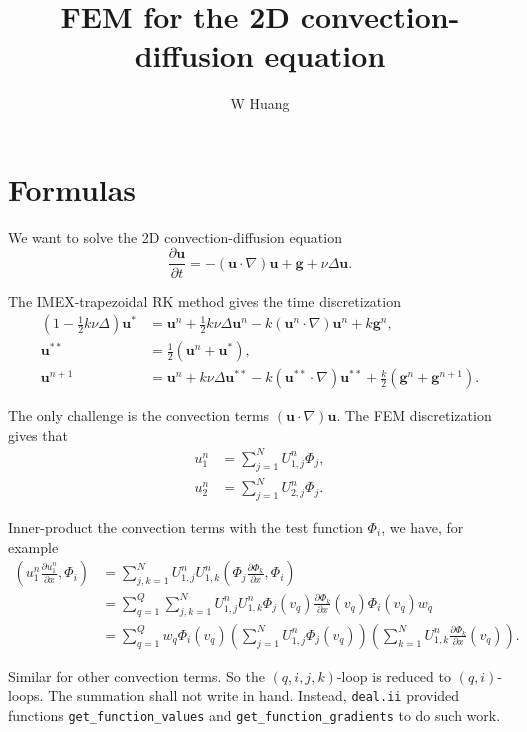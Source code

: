 \documentclass[lang=en,11pt,a4paper]{elegantpaper}
\title{FEM for the 2D convection-diffusion equation}
\author{W Huang}
\begin{document}
\maketitle

\section{Formulas}

We want to solve the 2D convection-diffusion equation
\begin{equation}
    \frac{\partial \mathbf{u}}{\partial t}=-(\mathbf{u}\cdot \nabla)\mathbf{u}+\mathbf{g}+\nu \Delta \mathbf{u}.
\end{equation}

The IMEX-trapezoidal RK method gives the time discretization
\begin{align}
    \left(1-\frac{1}{2}k\nu\Delta\right)\mathbf{u}^*&=\mathbf{u}^{n}+\frac{1}{2}k\nu\Delta\mathbf{u}^{n}-k(\mathbf{u}^n\cdot \nabla)\mathbf{u}^n+k\mathbf{g}^n,\\
    \mathbf{u}^{**}&=\frac{1}{2}(\mathbf{u}^n+\mathbf{u}^*),\\
    \mathbf{u}^{n+1}&=\mathbf{u}^n+k\nu\Delta\mathbf{u}^{**}-k(\mathbf{u}^{**}\cdot \nabla)\mathbf{u}^{**}+\frac{k}{2}(\mathbf{g}^n+\mathbf{g}^{n+1}).
\end{align}

The only challenge is the convection terms $(\mathbf{u}\cdot \nabla)\mathbf{u}$. 
The FEM discretization gives that
\begin{align}
    u_1^n&=\sum_{j=1}^N U_{1,j}^n \Phi_j,\\
    u_2^n&=\sum_{j=1}^N U_{2,j}^n \Phi_j.
\end{align}

Inner-product the convection terms with the test function $\Phi_i$, we have, for example
\begin{align}
    \left(u_1^n\frac{\partial u_1^n}{\partial x}, \Phi_i\right)&=\sum_{j,k=1}^N U_{1,j}^n U_{1,k}^n \left(\Phi_j\frac{\partial \Phi_k}{\partial x}, \Phi_i\right)\\
    &= \sum_{q=1}^Q \sum_{j,k=1}^N U_{1,j}^n U_{1,k}^n \Phi_j(v_q)\frac{\partial \Phi_k}{\partial x}(v_q)\Phi_i(v_q) w_q\\
    &= \sum_{q=1}^Q w_q\Phi_i(v_q) \left(\sum_{j=1}^N U_{1,j}^n\Phi_j(v_q)\right) \left(\sum_{k=1}^N U_{1,k}^n\frac{\partial \Phi_k}{\partial x}(v_q)\right).
\end{align}

Similar for other convection terms. So the $(q,i,j,k)$-loop is reduced to $(q,i)$-loops. 
The summation shall not write in hand. 
Instead, \verb|deal.ii| provided functions \verb|get_function_values| and \verb|get_function_gradients|
to do such work.
\end{document}
